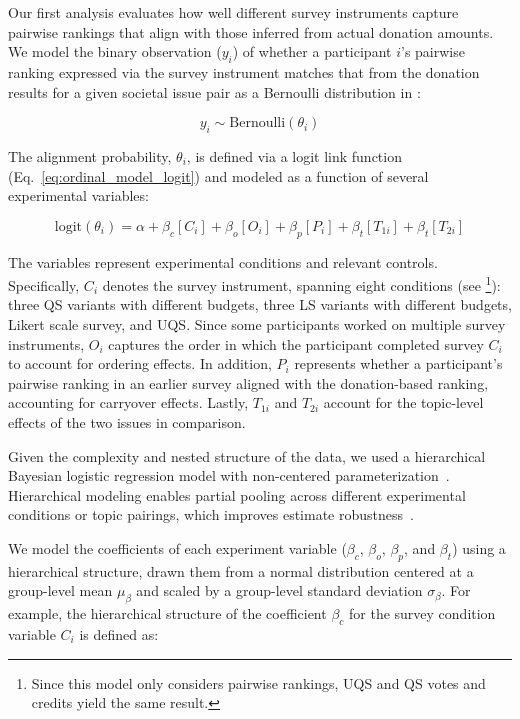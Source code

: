 Our first analysis evaluates how well different survey instruments capture pairwise rankings that align with those inferred from actual donation amounts. We model the binary observation ($y_i$) of whether a participant $i$'s pairwise ranking expressed via the survey instrument matches that from the donation results for a given societal issue pair as a Bernoulli distribution in :

\begin{equation}
    \label{eq:ordinal_model_overall}
    y_i \sim \text{Bernoulli}(\theta_i)
\end{equation}

The alignment probability, $\theta_i$, is defined via a logit link function (Eq.~\ref{eq:ordinal_model_logit}) and modeled as a function of several experimental variables:

\begin{equation}
    \label{eq:ordinal_model_logit}
    \text{logit}(\theta_i) = \alpha + \beta_c[C_i] + \beta_o[O_i] + \beta_p[P_i] + \beta_t[T_{1i}] + \beta_t[T_{2i}]
\end{equation}

The variables represent experimental conditions and relevant controls. Specifically, $C_i$ denotes the survey instrument, spanning eight conditions (see \footnote{Since this model only considers pairwise rankings, UQS and QS votes and credits yield the same result.}): three QS variants with different budgets, three LS variants with different budgets, Likert scale survey, and UQS. Since some participants worked on multiple survey instruments, $O_i$ captures the order in which the participant completed survey $C_i$ to account for ordering effects. In addition, $P_i$ represents whether a participant’s pairwise ranking in an earlier survey aligned with the donation-based ranking, accounting for carryover effects. Lastly, $T_{1i}$ and $T_{2i}$ account for the topic-level effects of the two issues in comparison.

Given the complexity and nested structure of the data, we used a hierarchical Bayesian logistic regression model with non-centered parameterization~\cite{mcelreath2018statistical}. Hierarchical modeling enables partial pooling across different experimental conditions or topic pairings, which improves estimate robustness~\cite{mcelreath2018statistical}. 

We model the coefficients of each experiment variable ($\beta_{c}$, $\beta_{o}$, $\beta_{p}$, and $\beta_{t}$) using a hierarchical structure, drawn them from a normal distribution centered at a group-level mean $\mu_{\beta}$ and scaled by a group-level standard deviation $\sigma_{\beta}$. For example, the hierarchical structure of the coefficient $\beta_c$ for the survey condition variable $C_i$ is defined as: 

